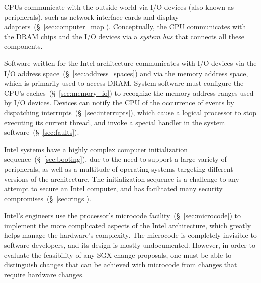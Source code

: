 CPUs communicate with the outside world via I/O devices (also known as
peripherals), such as network interface cards and display
adapters~(\S~\ref{sec:computer_map}). Conceptually, the CPU communicates with
the DRAM chips and the I/O devices via a \textit{system bus} that connects all
these components.

Software written for the Intel architecture communicates with I/O devices via
the I/O address space~(\S~\ref{sec:address_spaces}) and via the memory address
space, which is primarily used to access DRAM. System software must configure
the CPU's caches~(\S~\ref{sec:memory_io}) to recognize the memory address
ranges used by I/O devices. Devices can notify the CPU of the occurrence of
events by dispatching interrupts~(\S~\ref{sec:interrupts}), which cause a
logical processor to stop executing its current thread, and invoke a special
handler in the system software~(\S~\ref{sec:faults}).

Intel systems have a highly complex computer initialization
sequence~(\S~\ref{sec:booting}), due to the need to support a large variety of
peripherals, as well as a multitude of operating systems targeting different
versions of the architecture. The initialization sequence is a challenge to any
attempt to secure an Intel computer, and has facilitated many security
compromises~(\S~\ref{sec:rings}).

Intel's engineers use the processor's microcode
facility~(\S~\ref{sec:microcode}) to implement the more complicated aspects of
the Intel architecture, which greatly helps manage the hardware's complexity.
The microcode is completely invisible to software developers, and its design is
mostly undocumented. However, in order to evaluate the feasibility of any SGX
change proposals, one must be able to distinguish changes that can be achieved
with microcode from changes that require hardware changes.
